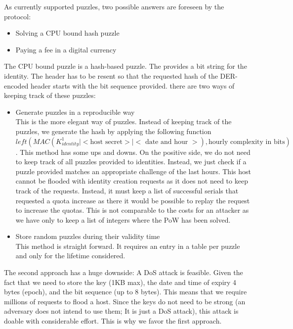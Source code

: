 As currently supported puzzles, two possible answers are foreseen by the protocol:
\begin{itemize}
	\item Solving a CPU bound hash puzzle 
	\item Paying a fee in a digital currency
\end{itemize}

The CPU bound puzzle is a hash-based puzzle. The \VortexNode{} provides a bit string for the identity. The header has to be resent so that the requested hash of the DER-encoded header starts with the bit sequence provided. there are two ways of keeping track of these puzzles:

\begin{itemize}
	\item Generate puzzles in a reproducible way\\
	This is the more elegant way of puzzles. Instead of keeping track of the puzzles, we generate the hash by applying the following function $left(MAC(K^1_{identity} | <\text{host secret}> | <\text{ date and hour }>),\text{hourly complexity in bits})$. This method has some ups and downs. On the positive side, we do not need to keep track of all puzzles provided to identities. Instead, we just check if a puzzle provided matches an appropriate challenge of the last hours. This host cannot be flooded with identity creation requests as it does not need to keep track of the requests. Instead, it must keep a list of successful serials that requested a quota increase as there it would be possible to replay the request to increase the quotas. This is not comparable to the costs for an attacker as we have only to keep a list of integers where the PoW has been solved.
	\item Store random puzzles during their validity time\\
	This method is straight forward. It requires an entry in a table per puzzle and only for the lifetime considered. 
\end{itemize}

The second approach has a huge downside: A DoS attack is feasible. Given the fact that we need to store the key (1KB max), the date and time of expiry 4 bytes (epoch), and the bit sequence (up to 8 bytes). This means that we require millions of requests to flood a host. Since the keys do not need to be strong (an adversary does not intend to use them; It is just a DoS attack), this attack is doable with considerable effort. This is why we favor the first approach.

